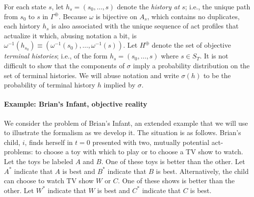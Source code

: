 \documentclass[
11pt,
titlepage,
reqno,
]{article}%
\theoremstyle{definition}
\begin{document}
For each state $s$, let $h_s=(s_0,\ldots,s)$ denote the \textit{history at} $s$; i.e., the unique path from $s_0$ to $s$ in $\Gamma^\oplus$.
Because $\omega$ is bijective on $A_s$, which contains no duplicates, each history $h_s$ is also associated with the unique sequence of act profiles that actualize it which, abusing notation a bit, is  $\omega^{-1}(h_{s_0})\equiv(\omega^{-1}(s_0),\ldots,\omega^{-1}(s))$.
Let $H^\oplus$ denote the set of objective \textit{terminal histories}; i.e., of the form $h_s=(s_0,\ldots,s)$ where $s\in S_T$.
It is not difficult to show that the components of $\sigma$ imply a probability distribution on the set of terminal histories.
We will abuse notation and write $\sigma(h)$ to be the probability of terminal history $h$ implied by $\sigma$.
		
\paragraph{Example: Brian's Infant, objective reality}	
We consider the problem of Brian's Infant, an extended example that we will use  to illustrate the formalism as we develop it.
The situation is as follows.
Brian's child, $i$, finds herself in $t=0$ presented with two, mutually potential act-problems: to choose a toy with which to play or to choose a TV show to watch. 
Let the toys be labeled $A$ and $B$. 
One of these toys is better than the other. 
Let $A^\ast$ indicate that $A$ is best and $B^\ast$ indicate that $B$ is best. 
Alternatively, the child can choose to watch TV show $W$ or $C$.
One of these shows is better than the other. 
Let $W^\ast$ indicate that $W$ is best and $C^\ast$ indicate that $C$ is best.

\end{document}
